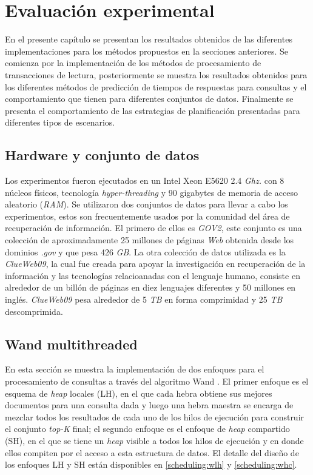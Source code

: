 \chapter{Evaluación experimental}
\label{cap:evaluacionexperimental}
En el presente capítulo se presentan los resultados obtenidos de las diferentes implementaciones para los métodos propuestos en la secciones anteriores. Se comienza por la implementación de los métodos de procesamiento de transacciones de lectura, posteriormente se muestra los resultados obtenidos para los diferentes métodos de predicción de tiempos de respuestas para consultas y el comportamiento que tienen para diferentes conjuntos de datos. Finalmente se presenta el comportamiento de las estrategias de planificación presentadas para diferentes tipos de escenarios.

\section{Hardware y conjunto de datos}
\label{evaluacionexperimental:hardwareydatos}
Los experimentos fueron ejecutados en un Intel Xeon E5620 2.4 \textit{Ghz.} con 8 núcleos físicos, tecnología \textit{hyper-threading} y 90 gigabytes de memoria de acceso aleatorio (\textit{RAM}). Se utilizaron dos conjuntos de datos para llevar a cabo los experimentos, estos son frecuentemente usados por la comunidad del área de recuperación de información. El primero de ellos es \textit{GOV2}, este conjunto es una colección de aproximadamente 25 millones de páginas \textit{Web} obtenida desde los dominios \textit{.gov} y que pesa 426 \textit{GB}. La otra colección de datos utilizada es la \textit{ClueWeb09}, la cual fue creada para apoyar la investigación en recuperación de la información y las tecnologías relacioanadas con el lenguaje humano, consiste en alrededor de un billón de páginas en diez lenguajes diferentes y 50 millones en inglés. \textit{ClueWeb09} pesa alrededor de 5 \textit{TB} en forma comprimidad y 25 \textit{TB} descomprimida. 

\section{Wand multithreaded}
\label{evaluacionexperimental:wm}
En esta sección se muestra la implementación de dos enfoques para el procesamiento de consultas a través del algoritmo Wand \citep{Broder:2003}. El primer enfoque es el esquema de \textit{heap} locales (LH), en el que cada hebra obtiene sus mejores documentos para una consulta dada y luego una hebra maestra se encarga de mezclar todos los resultados de cada uno de los hilos de ejecución para construir el conjunto \textit{top-K} final; el segundo enfoque es el enfoque de \textit{heap} compartido (SH), en el que se tiene un \textit{heap} visible a todos los hilos de ejecución y en donde ellos compiten por el acceso a esta estructura de datos. El detalle del diseño de los enfoques LH y SH están disponibles en \ref{scheduling:wlh} y \ref{scheduling:whc}. 

